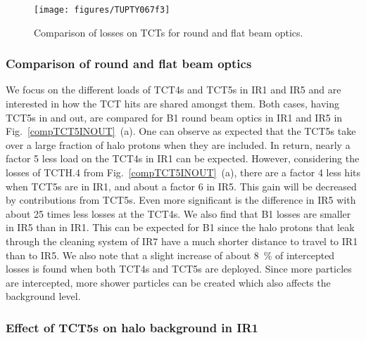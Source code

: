 \begin{figure}[tbh]
    \centering
    \texttt{[image: figures/TUPTY067f3]}
    \vspace{-0.5cm}
    \caption{Comparison of losses on TCTs for round and flat beam optics.}
    \label{compOptics}
\end{figure}

\subsubsection{Comparison of round and flat beam optics}
We focus on the different loads of TCT4s and TCT5s in IR1 and IR5 and are interested in how the TCT hits are shared amongst them. Both cases, having TCT5s in and out, are compared for B1 round beam optics in IR1 and IR5 in Fig.~\ref{compTCT5INOUT}~(a). One can observe as expected that the TCT5s take over a large fraction of halo protons when they are included. In return, nearly a factor 5 less load on the TCT4s in IR1 can be expected. However, considering the losses of TCTH.4 from Fig.~\ref{compTCT5INOUT}~(a), there are a factor 4 less hits when TCT5s are in IR1, and about a factor 6 in IR5. This gain will be decreased by contributions from TCT5s. Even more significant is the difference in IR5 with about 25 times less losses at the TCT4s. We also find that B1 losses are smaller in IR5 than in IR1. This can be expected for B1 since the halo protons that leak through the cleaning system of IR7 have a much shorter distance to travel to IR1 than to IR5. We also note that a slight increase of about 8~\% of intercepted losses is found when both TCT4s and TCT5s are deployed. Since more particles are intercepted, more shower particles can be created which also affects the background level. %


\subsubsection{Effect of TCT5s on halo background in IR1}


